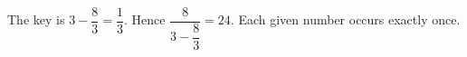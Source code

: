 The key is $3-\dfrac{8}{3}=\dfrac{1}{3}$. Hence $\boxed{\dfrac{8}{3-\dfrac{8}{3}}=24}$. Each given number occurs exactly once.

